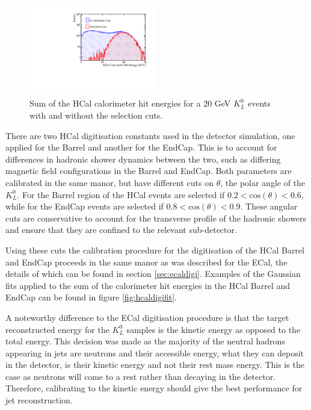 \begin{figure}
\includegraphics[width=0.5\textwidth]{EnergyEstimators/Plots/Calibration/Digitsation/HCal/DigitisationHCalSelection.pdf}
\caption[Sum of the HCal calorimeter hit energies for a 20 GeV $K^{0}_{L}$ events with and without the selection cuts.]{Sum of the HCal calorimeter hit energies for a 20 GeV $K^{0}_{L}$ events with and without the selection cuts.}
\label{fig:hcaldigiselection}
\end{figure}

There are two HCal digitisation constants used in the detector simulation, one applied for the Barrel and another for the EndCap.  This is to account for differences in hadronic shower dynamics between the two, such as differing magnetic field configurations in the Barrel and EndCap.  Both parameters are calibrated in the same manor, but have different cuts on $\theta$, the polar angle of the $K^{0}_{L}$.  For the Barrel region of the HCal events are selected if $0.2 < \text{cos}(\theta) < 0.6$, while for the EndCap events are selected if $0.8 < \text{cos}(\theta) < 0.9$.  These angular cuts are conservative to account for the transverse profile of the hadronic showers and ensure that they are confined to the relevant sub-detector.

Using these cuts the calibration procedure for the digitisation of the HCal Barrel and EndCap proceeds in the same manor as was described for the ECal, the details of which can be found in section \ref{sec:ecaldigi}.  Examples of the Gaussian fits applied to the sum of the calorimeter hit energies in the HCal Barrel and EndCap can be found in figure \ref{fig:hcaldigifit}.  

A noteworthy difference to the ECal digitisation procedure is that the target reconstructed energy for the $K^{0}_{L}$ samples is the kinetic energy as opposed to the total energy.  This decision was made as the majority of the neutral hadrons appearing in jets are neutrons and their accessible energy, what they can deposit in the detector, is their kinetic energy and not their rest mass energy.  This is the case as neutrons will come to a rest rather than decaying in the detector.  Therefore, calibrating to the kinetic energy should give the best performance for jet reconstruction.  

